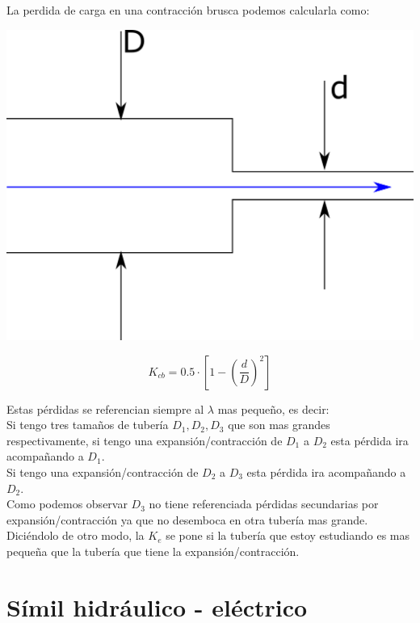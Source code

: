 \documentclass[10pt,a4paper]{article}
\begin{document}
La perdida de carga en una contracción brusca podemos calcularla como:
\begin{center}
    \includegraphics[scale = 0.5]{Contraccion Brusca.png}
    \begin{tcolorbox}[colback=yellow!40!white, colframe=red!50!black, width=9cm,title=Contracción Brusca]
    $$
        K_{cb} = 0.5 \cdot \left[ 1 - \left( \frac{d}{D} \right)^2 \right]
    $$
    \end{tcolorbox}
\end{center}

Estas pérdidas se referencian siempre al $\lambda$ mas pequeño, es decir:
\\

Si tengo tres tamaños de tubería $D_1, D_2, D_3$ que son mas grandes respectivamente, si tengo una expansión/contracción de $D_1$ a $D_2$ esta pérdida ira acompañando a $D_1$.
\\
Si tengo una expansión/contracción de $D_2$ a $D_3$ esta pérdida ira acompañando a $D_2$.
\\
Como podemos observar $D_3$ no tiene referenciada pérdidas secundarias por expansión/contracción ya que no desemboca en otra tubería mas grande.
\\

Diciéndolo de otro modo, la $K_e$ se pone si la tubería que estoy estudiando es mas pequeña que la tubería que tiene la expansión/contracción.

\newpage
\section{Símil hidráulico - eléctrico}
\end{document}
